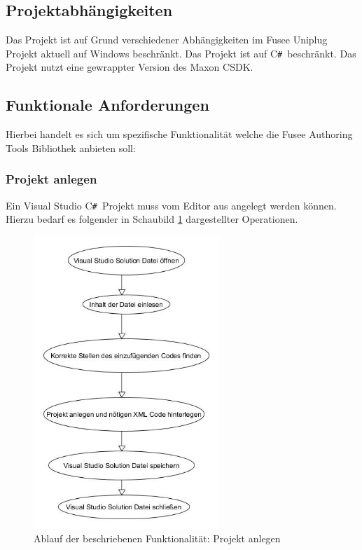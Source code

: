 \documentclass[pagesize, paper=a4, fontsize=12pt, titlepage=true, headings=small, headnosepline, abstractoff, liststotoc, nochapterprefix, plainheadsepline, twoside]{scrreprt}
\newcommand{\CSS}{C\texttt{\# }}
\newcommand{\CPP}{C\nolinebreak\hspace{-.05em}\raisebox{.4ex}{\tiny\bf +}\nolinebreak\hspace{-.10em}\raisebox{.4ex}{\tiny\bf +}}
\begin{document}
\subsection{Projektabhängigkeiten}
Das Projekt ist auf Grund verschiedener Abhängigkeiten im Fusee  Uniplug Projekt aktuell auf Windows beschränkt.
Das Projekt ist auf \CSS beschränkt.
Das Projekt nutzt eine gewrappter Version des Maxon \CPP SDK.

\subsection{Funktionale Anforderungen}
Hierbei handelt es sich um spezifische Funktionalität welche die Fusee Authoring Tools Bibliothek anbieten soll:

\subsubsection{Projekt anlegen}
Ein Visual Studio \CSS Projekt muss vom Editor aus angelegt werden können. Hierzu bedarf es folgender in Schaubild \ref{re:projektanlegen} dargestellter Operationen. 

\begin{figure}[ht]
	\centering
	\includegraphics[width=7cm]{Bilder/ProjektAnlegen.jpg}
	\caption{Ablauf der beschriebenen Funktionalität: Projekt anlegen}
	\label{re:projektanlegen}
\end{figure}
\end{document}
